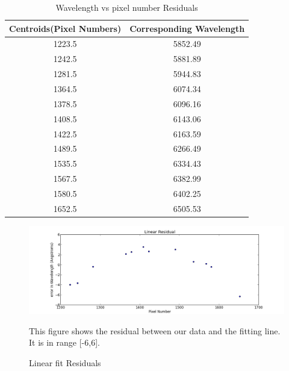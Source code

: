 \documentclass[letterpaper,12pt]{article}
\begin{document}
\FloatBarrier
\begin{table}
\caption{Wavelength vs pixel number Residuals} %
\centering %
\begin{tabular}{c c} %
\hline\hline %
Centroids(Pixel Numbers) & Corresponding Wavelength\\ [0.5ex] %
\hline %
1223.5 & 5852.49\\ %
1242.5 & 5881.89 \\
1281.5 & 5944.83 \\
1364.5 & 6074.34 \\
1378.5 & 6096.16 \\ 
1408.5 & 6143.06 \\ 
1422.5 & 6163.59 \\
1489.5 & 6266.49 \\
1535.5 & 6334.43 \\
1567.5 & 6382.99 \\
1580.5 & 6402.25 \\
1652.5 & 6505.53\\ [1ex] %
\hline %
\end{tabular}
\label{table:nonlin} %
\end{table}
\FloatBarrier


\begin{figure}[t!]
\centering
\includegraphics[scale=0.5]{linear_residual.png}
\caption{Linear fit Residuals}
This figure shows the residual between our data and the fitting line. It is in range [-6,6].
\end{figure}
\end{document}
